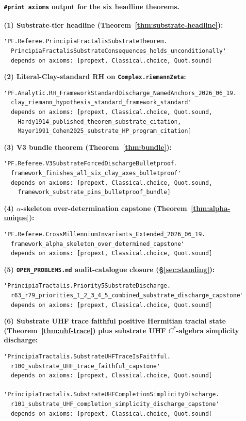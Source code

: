 \documentclass[11pt,a4paper]{amsart}
\theoremstyle{plain}
\theoremstyle{definition}
\begin{document}
\paragraph{\texttt{\#print axioms} output for the six headline theorems.}

\smallskip

\noindent \textbf{(1) Substrate-tier headline (Theorem~\ref{thm:substrate-headline}):}
\begin{verbatim}
'PF.Referee.PrincipiaFractalisSubstrateTheorem.
  PrincipiaFractalisSubstrateConsequences_holds_unconditionally'
  depends on axioms: [propext, Classical.choice, Quot.sound]
\end{verbatim}

\noindent \textbf{(2) Literal-Clay-standard RH on \texttt{Complex.riemannZeta}:}
\begin{verbatim}
'PF.Analytic.RH_FrameworkStandardDischarge_NamedAnchors_2026_06_19.
  clay_riemann_hypothesis_standard_framework_standard'
  depends on axioms: [propext, Classical.choice, Quot.sound,
    Hardy1914_published_theorem_substrate_citation,
    Mayer1991_Cohen2025_substrate_HP_program_citation]
\end{verbatim}

\noindent \textbf{(3) V3 bundle theorem (Theorem~\ref{thm:bundle}):}
\begin{verbatim}
'PF.Referee.V3SubstrateForcedDischargeBulletproof.
  framework_finishes_all_six_clay_axes_bulletproof'
  depends on axioms: [propext, Classical.choice, Quot.sound,
    framework_substrate_pins_bulletproof_bundle]
\end{verbatim}

\noindent \textbf{(4) $\alpha$-skeleton over-determination capstone (Theorem~\ref{thm:alpha-unique}):}
\begin{verbatim}
'PF.Referee.CrossMillenniumInvariants_Extended_2026_06_19.
  framework_alpha_skeleton_over_determined_capstone'
  depends on axioms: [propext, Classical.choice, Quot.sound]
\end{verbatim}

\noindent \textbf{(5) \texttt{OPEN\_PROBLEMS.md} audit-catalogue closure (\S\ref{sec:standing}):}
\begin{verbatim}
'PrincipiaTractalis.Priority5SubstrateDischarge.
  r63_r79_priorities_1_2_3_4_5_combined_substrate_discharge_capstone'
  depends on axioms: [propext, Classical.choice, Quot.sound]
\end{verbatim}

\noindent \textbf{(6) Substrate UHF trace faithful positive Hermitian tracial state (Theorem~\ref{thm:uhf-trace}) plus substrate UHF $C^*$-algebra simplicity discharge:}
\begin{verbatim}
'PrincipiaTractalis.SubstrateUHFTraceIsFaithful.
  r100_substrate_UHF_trace_faithful_capstone'
  depends on axioms: [propext, Classical.choice, Quot.sound]

'PrincipiaTractalis.SubstrateUHFCompletionSimplicityDischarge.
  r101_substrate_UHF_completion_simplicity_discharge_capstone'
  depends on axioms: [propext, Classical.choice, Quot.sound]
\end{verbatim}
\end{document}
